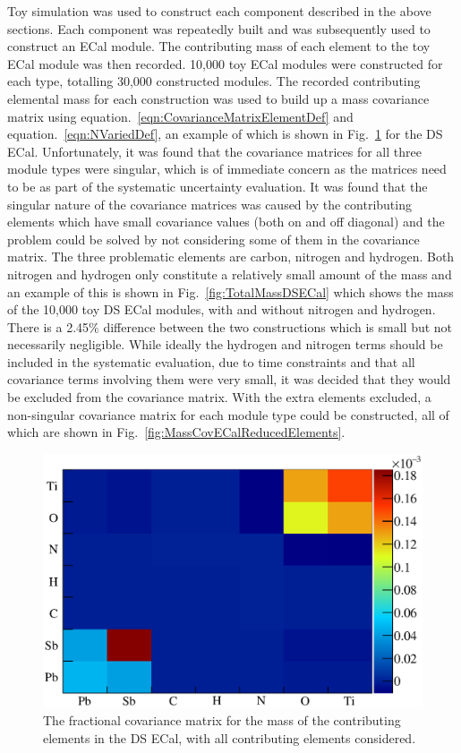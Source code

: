 \label{subsubsec:ECalMassCovariance}
Toy simulation was used to construct each component described in the above sections.  Each component was repeatedly built and was subsequently used to construct an ECal module.  The contributing mass of each element to the toy ECal module was then recorded.  10,000 toy ECal modules were constructed for each type, totalling 30,000 constructed modules.  The recorded contributing elemental mass for each construction was used to build up a mass covariance matrix using equation.~\ref{eqn:CovarianceMatrixElementDef} and equation.~\ref{eqn:NVariedDef}, an example of which is shown in Fig.~\ref{fig:MassCovDSECalAllElements} for the DS ECal.  Unfortunately, it was found that the covariance matrices for all three module types were singular, which is of immediate concern as the matrices need to be  as part of the systematic uncertainty evaluation.  It was found that the singular nature of the covariance matrices was caused by the contributing elements which have small covariance values (both on and off diagonal) and the problem could be solved by not considering some of them in the covariance matrix.  The three problematic elements are carbon, nitrogen and hydrogen.  Both nitrogen and hydrogen only constitute a relatively small amount of the mass and an example of this is shown in Fig.~\ref{fig:TotalMassDSECal} which shows the mass of the 10,000 toy DS ECal modules, with and without nitrogen and hydrogen.  There is a 2.45$\%$ difference between the two constructions which is small but not necessarily negligible.  While ideally the hydrogen and nitrogen terms should be included in the systematic evaluation, due to time constraints and that all covariance terms involving them were very small, it was decided that they would be excluded from the covariance matrix.  With the extra elements excluded, a non-singular covariance matrix for each module type could be constructed, all of which are shown in Fig.~\ref{fig:MassCovECalReducedElements}.
\begin{figure}
  \centering
  \includegraphics[width=12cm]{images/measurement/systematics/detector/mass/MassCov_DSECal_AllElements.eps}
  \caption{The fractional covariance matrix for the mass of the contributing elements in the DS ECal, with all contributing elements considered.}
  \label{fig:MassCovDSECalAllElements}
\end{figure}
